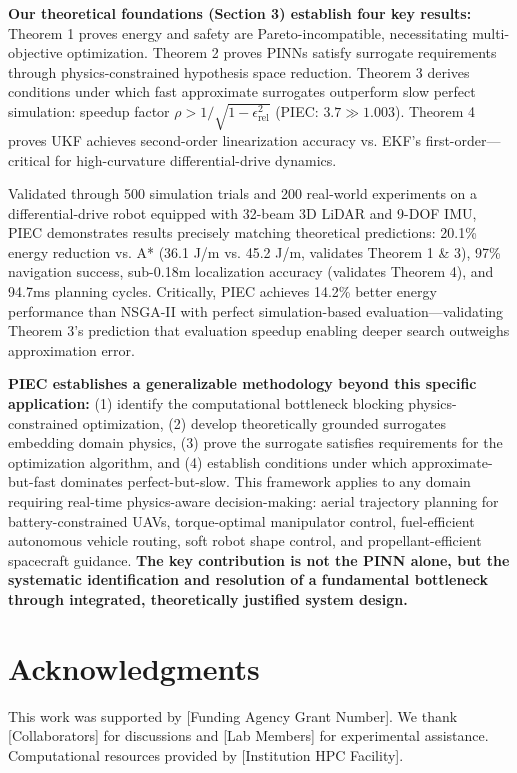 \documentclass[pdflatex,sn-nature]{sn-jnl}%
\begin{document}
\textbf{Our theoretical foundations (Section 3) establish four key results:} Theorem 1 proves energy and safety are Pareto-incompatible, necessitating multi-objective optimization. Theorem 2 proves PINNs satisfy surrogate requirements through physics-constrained hypothesis space reduction. Theorem 3 derives conditions under which fast approximate surrogates outperform slow perfect simulation: speedup factor $\rho > 1/\sqrt{1-\epsilon_{\text{rel}}^2}$ (PIEC: $3.7 \gg 1.003$). Theorem 4 proves UKF achieves second-order linearization accuracy vs. EKF's first-order—critical for high-curvature differential-drive dynamics.

Validated through 500 simulation trials and 200 real-world experiments on a differential-drive robot equipped with 32-beam 3D LiDAR and 9-DOF IMU, PIEC demonstrates results precisely matching theoretical predictions: 20.1\% energy reduction vs. A* (36.1 J/m vs. 45.2 J/m, validates Theorem 1 \& 3), 97\% navigation success, sub-0.18m localization accuracy (validates Theorem 4), and 94.7ms planning cycles. Critically, PIEC achieves 14.2\% better energy performance than NSGA-II with perfect simulation-based evaluation—validating Theorem 3's prediction that evaluation speedup enabling deeper search outweighs approximation error.

\textbf{PIEC establishes a generalizable methodology beyond this specific application:} (1) identify the computational bottleneck blocking physics-constrained optimization, (2) develop theoretically grounded surrogates embedding domain physics, (3) prove the surrogate satisfies requirements for the optimization algorithm, and (4) establish conditions under which approximate-but-fast dominates perfect-but-slow. This framework applies to any domain requiring real-time physics-aware decision-making: aerial trajectory planning for battery-constrained UAVs, torque-optimal manipulator control, fuel-efficient autonomous vehicle routing, soft robot shape control, and propellant-efficient spacecraft guidance. \textbf{The key contribution is not the PINN alone, but the systematic identification and resolution of a fundamental bottleneck through integrated, theoretically justified system design.}

\section*{Acknowledgments}
This work was supported by [Funding Agency Grant Number]. We thank [Collaborators] for discussions and [Lab Members] for experimental assistance. Computational resources provided by [Institution HPC Facility].
\end{document}
